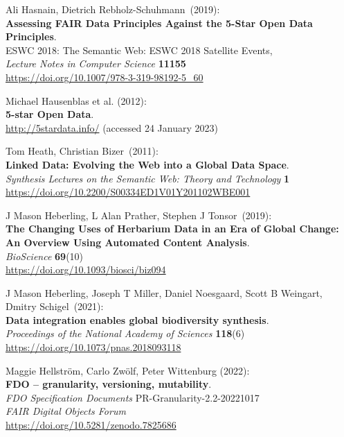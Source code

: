 \begin{thebibliography}{9}
Ali Hasnain, Dietrich Rebholz-Schuhmann~(2019):\\
\textbf{Assessing FAIR Data Principles Against the 5-Star Open Data
Principles}.\\
ESWC 2018: The Semantic Web: ESWC 2018 Satellite Events,\\
\emph{Lecture Notes in Computer Science} \textbf{11155}\\
\url{https://doi.org/10.1007/978-3-319-98192-5_60}

Michael Hausenblas et al. (2012): \\
\textbf{5-star {Open Data}}. \\
\url{http://5stardata.info/} (accessed 24 January 2023)

Tom Heath, Christian Bizer~(2011):\\
\textbf{Linked Data: Evolving the Web into a Global Data Space}.\\
\emph{Synthesis Lectures on the Semantic Web: Theory and Technology} \textbf{1}\\
\url{https://doi.org/10.2200/S00334ED1V01Y201102WBE001}

J Mason Heberling, L Alan Prather, Stephen J Tonsor~(2019):\\
\textbf{The Changing Uses of Herbarium Data in an Era of Global Change: An Overview
Using Automated Content Analysis}.\\
\emph{BioScience} \textbf{69}(10)\\
\url{https://doi.org/10.1093/biosci/biz094}

J Mason Heberling, Joseph T Miller, Daniel Noesgaard, Scott B Weingart, Dmitry Schigel~(2021):\\
\textbf{Data integration enables global biodiversity
synthesis}.\\
\emph{Proceedings of the National Academy of Sciences} \textbf{118}(6)\\
\url{https://doi.org/10.1073/pnas.2018093118}

Maggie Hellström, Carlo Zwölf, Peter Wittenburg (2022): \\
\textbf{FDO -- granularity, versioning, mutability}. \\
\emph{FDO Specification Documents} PR-Granularity-2.2-20221017\\
\emph{FAIR Digital Objects Forum}\\
\url{https://doi.org/10.5281/zenodo.7825686}


\end{thebibliography}
